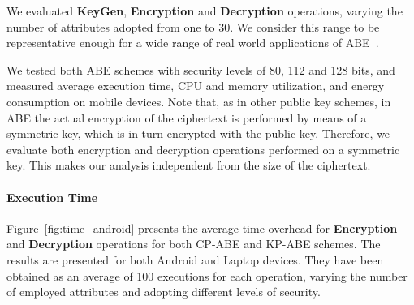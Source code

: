\documentclass{sig-alternate-2013}
\begin{document}
 We evaluated {\bf KeyGen}, {\bf Encryption} and {\bf Decryption} operations, varying the number of attributes adopted from one to 30. We consider this range to be representative enough for a wide range of real world applications of ABE~\cite{ABE_icc_2014}. 


 
 We tested both ABE schemes with security levels of 80, 112 and 128 bits, and measured average execution time, CPU and memory utilization, and energy consumption on mobile devices.
 Note that, as in other public key schemes, in ABE the actual encryption of the ciphertext is performed by means of a symmetric key, which is in turn encrypted with the public key. Therefore, we evaluate both encryption and decryption operations performed on a symmetric key. 
 This makes our analysis independent from the size of the ciphertext.

\paragraph{Execution Time} Figure~\ref{fig:time_android} presents the average time overhead for {\bf Encryption} and {\bf Decryption} operations for both CP-ABE and KP-ABE schemes. The results are presented for both Android and Laptop devices. They have been obtained as an average of 100 executions for each operation, varying the number of employed attributes and adopting different levels of security. 


 
 \newcommand{\picsize}{.95\columnwidth}
\newcommand{\picboxsize}{0.49\columnwidth}
\end{document}
